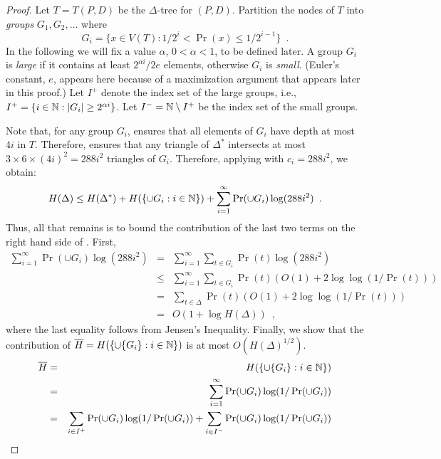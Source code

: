 \documentclass[lotsofwhite]{patmorin}
\begin{document}
\begin{proof}
Let $T=T(P,D)$ be the $\Delta$-tree for $(P,D)$.
Partition the nodes of $T$ into
\emph{groups} $G_1,G_2,\ldots$ where
\[
	G_i = \{x\in V(T) : 1/2^{i} < \Pr(x) \le 1/2^{i-1} \} \enspace .
\]
In the following we will fix a value $\alpha$, $0 < \alpha < 1$,
to be defined later.  A group $G_i$ is \emph{large} if it contains
at least $2^{\alpha i}/2e$ elements, otherwise $G_i$ is \emph{small}.
(Euler's constant, $e$, appears here because of a maximization argument
that appears later in this proof.)  Let $I^+$ denote the index set of the large
groups, i.e., $I^{+}=\{i\in\mathbb{N} : |G_i| \ge 2^{\alpha i}\}$.  Let $I^{-}=
\mathbb{N}\setminus I^+$ be the index set of the small groups.

Note that, for any group $G_i$,  ensures that all
elements of $G_i$ have depth at most $4i$ in $T$.  Therefore, 
 ensures that any triangle of
$\Delta^*$ intersects at most $3\times 6\times (4i)^2=288i^2$ 
triangles of $G_{i}$.  Therefore,
applying  with $c_{i}=288i^2$, we obtain:
\begin{equation} 
 H(\Delta) \le 
   H(\Delta^*) + H(\{{\cup G_{i}} : i\in\N\}) 
   + \sum_{i=1}^{\infty}\Pr(\cup G_{i})\log(288i^2)  \enspace .
   \eqlabelx{doit}
\end{equation}
Thus, all that remains is to bound the contribution of the last two
terms on the right hand side of .  First,
\begin{eqnarray*}
   \sum_{i=1}^{\infty}\Pr(\cup G_{i})\log(288i^2)
   &   =  & \sum_{i=1}^\infty\sum_{t\in G_i}\Pr(t)\log(288i^2) \\
   &  \le  & \sum_{i=1}^\infty\sum_{t\in G_i}\Pr(t)(O(1)+2\log\log(1/\Pr(t))) \\
    &  =  & \sum_{t\in\Delta} \Pr(t) (O(1)+2\log\log(1/\Pr(t))) \\
    &  =  & O(1+\log H(\Delta)) \enspace ,
\end{eqnarray*}
where the last equality follows from Jensen's Inequality.
Finally, we show that the contribution of $\overline
H=H(\{\cup\{G_{i}\} : i\in\mathbb{N}\})$ is at most
$O(H(\Delta)^{1/2})$. 
\begin{eqnarray*}
\overline H 
 &  =  & H(\{\cup\{G_{i}\} : i\in\N\}) \\
 &  =  & \sum_{i=1}^\infty\Pr(\cup G_{i})\log(1/\Pr(\cup G_{i})) \\
 &  =  & \sum_{i\in I^+}\Pr(\cup G_{i})\log(1/\Pr(\cup G_{i})) 
         + \sum_{i\in I^-}\Pr(\cup G_{i})\log(1/\Pr(\cup G_{i})) \\

\end{eqnarray*}
\end{proof}
\end{document}
